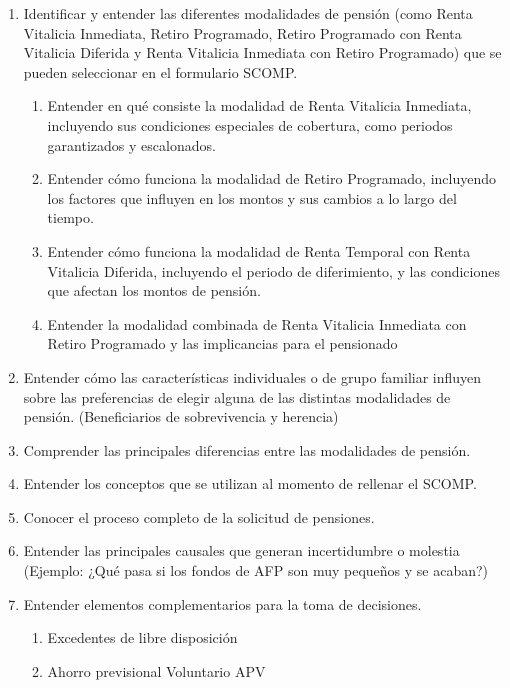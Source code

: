 \begin{enumerate}
    \item Identificar y entender las diferentes modalidades de pensión (como Renta Vitalicia Inmediata, Retiro Programado, Retiro Programado con Renta Vitalicia Diferida y Renta Vitalicia Inmediata con Retiro Programado) que se pueden seleccionar en el formulario SCOMP.
    \begin{enumerate}
        \item Entender en qué consiste la modalidad de Renta Vitalicia Inmediata, incluyendo sus condiciones especiales de cobertura, como periodos garantizados y escalonados.
        \item Entender cómo funciona la modalidad de Retiro Programado, incluyendo los factores que influyen en los montos y sus cambios a lo largo del tiempo.
        \item Entender cómo funciona la modalidad de Renta Temporal con Renta Vitalicia Diferida, incluyendo el periodo de diferimiento, y las condiciones que afectan los montos de pensión.  
        \item Entender la modalidad combinada de Renta Vitalicia Inmediata con Retiro Programado y las implicancias para el pensionado %
    \end{enumerate}
    
    \item Entender cómo las características individuales o de grupo familiar influyen sobre las preferencias de elegir alguna de las distintas modalidades de pensión. (Beneficiarios de sobrevivencia y herencia)
    \item Comprender las principales diferencias entre las modalidades de pensión. 
    \item Entender los conceptos que se utilizan al momento de rellenar el SCOMP. 
    \item  Conocer el proceso completo de la solicitud de pensiones.
    \item Entender las principales causales que generan incertidumbre o molestia (Ejemplo: ¿Qué pasa si los fondos de AFP son muy pequeños y se acaban?)
    \item Entender elementos complementarios para la toma de decisiones.
    \begin{enumerate}

        \item Excedentes de libre disposición 
        \item Ahorro previsional Voluntario APV
    \end{enumerate}
    
    
\end{enumerate}

